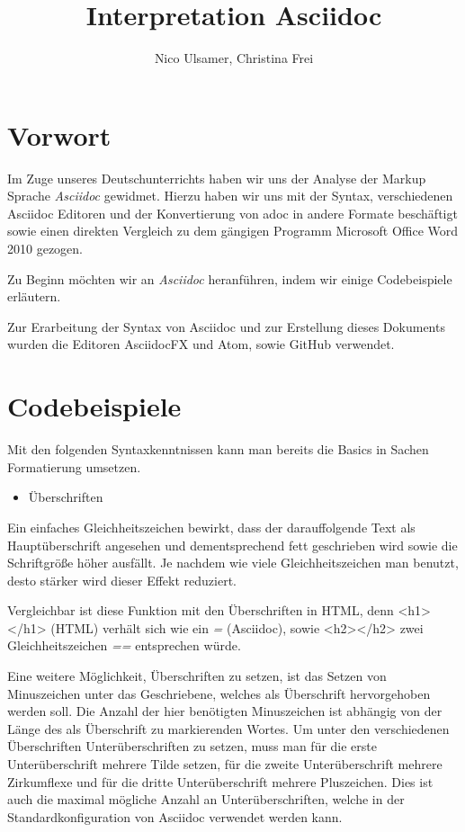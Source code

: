 \documentclass[11pt]{amsbook}
\title{Interpretation Asciidoc}
\author{Nico Ulsamer, Christina Frei}
\date{}
\begin{document}
\maketitle
\tableofcontents
\hypertarget{x-vorwort}{\chapter*{Vorwort}}
Im Zuge unseres Deutschunterrichts haben wir uns der Analyse der Markup Sprache \emph{Asciidoc} gewidmet.
Hierzu haben wir uns mit der Syntax, verschiedenen Asciidoc Editoren und der Konvertierung von adoc in andere Formate beschäftigt sowie einen direkten Vergleich zu dem gängigen Programm Microsoft Office Word 2010 gezogen.


Zu Beginn möchten wir an \emph{Asciidoc} heranführen, indem wir einige Codebeispiele erläutern.


Zur Erarbeitung der Syntax von Asciidoc und zur Erstellung dieses Dokuments wurden die Editoren AsciidocFX und Atom, sowie GitHub verwendet.


\hypertarget{x-codebeispiele}{\chapter*{Codebeispiele}}
Mit den folgenden Syntaxkenntnissen kann man bereits die Basics in Sachen Formatierung umsetzen.


\begin{itemize}

\item Überschriften

\end{itemize}


Ein einfaches Gleichheitszeichen bewirkt, dass der darauffolgende Text als Hauptüberschrift angesehen und dementsprechend fett geschrieben wird sowie die Schriftgröße höher ausfällt. Je nachdem wie viele Gleichheitszeichen man benutzt, desto stärker wird dieser Effekt reduziert.


Vergleichbar ist diese Funktion mit den Überschriften in HTML, denn <h1></h1> (HTML) verhält sich wie ein \emph{=} (Asciidoc), sowie <h2></h2> zwei Gleichheitszeichen \emph{==} entsprechen würde.


Eine weitere Möglichkeit, Überschriften zu setzen, ist das Setzen von Minuszeichen unter das Geschriebene, welches als Überschrift hervorgehoben werden soll. Die Anzahl der hier benötigten Minuszeichen ist abhängig von der Länge des als Überschrift zu markierenden Wortes.
Um unter den verschiedenen Überschriften Unterüberschriften zu setzen, muss man für die erste Unterüberschrift mehrere Tilde setzen, für die zweite Unterüberschrift mehrere Zirkumflexe und für die dritte Unterüberschrift mehrere Pluszeichen. Dies ist auch die maximal mögliche Anzahl an Unterüberschriften, welche in der Standardkonfiguration von Asciidoc verwendet werden kann.
\end{document}
